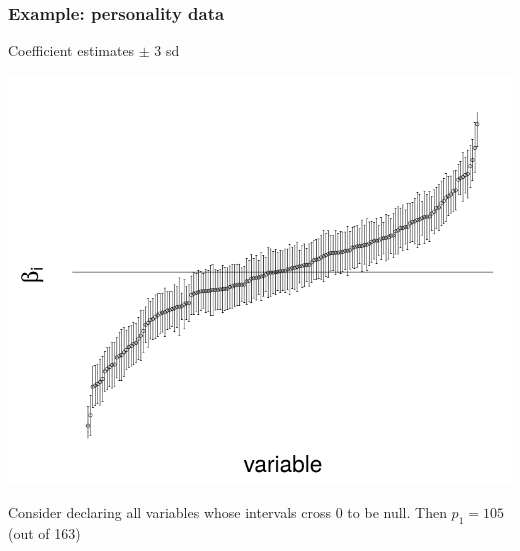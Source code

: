 \documentclass{beamer}
\begin{document}
\begin{frame}
\frametitle{Example: personality data}
Coefficient estimates $\pm$ 3 sd
\begin{center}
\includegraphics[scale = 0.2]{pf16_coefs.png}
\end{center}
Consider declaring all variables whose intervals cross 0 to be null.
Then $p_1 = 105$ (out of 163)
\end{frame}
\end{document}
